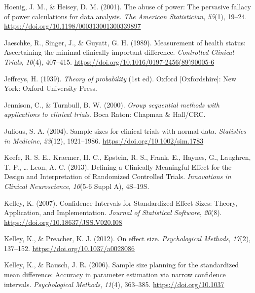 \documentclass[
  english,
  ,jou, a4paper,floatsintext]{apa6}
\newlength{\cslhangindent}
\newenvironment{cslreferences}%
  {\setlength{\parindent}{0pt}%
  \everypar{\setlength{\hangindent}{\cslhangindent}}\ignorespaces}%
  {\par}
\begin{document}
\begin{cslreferences}
\leavevmode\hypertarget{ref-hoenig_abuse_2001}{}%
Hoenig, J. M., \& Heisey, D. M. (2001). The abuse of power: The pervasive fallacy of power calculations for data analysis. \emph{The American Statistician}, \emph{55}(1), 19--24. \url{https://doi.org/10.1198/000313001300339897}

\leavevmode\hypertarget{ref-jaeschke_measurement_1989}{}%
Jaeschke, R., Singer, J., \& Guyatt, G. H. (1989). Measurement of health status: Ascertaining the minimal clinically important difference. \emph{Controlled Clinical Trials}, \emph{10}(4), 407--415. \url{https://doi.org/10.1016/0197-2456(89)90005-6}

\leavevmode\hypertarget{ref-jeffreys_theory_1939}{}%
Jeffreys, H. (1939). \emph{Theory of probability} (1st ed). Oxford {[}Oxfordshire{]}: New York: Oxford University Press.

\leavevmode\hypertarget{ref-jennison_group_2000}{}%
Jennison, C., \& Turnbull, B. W. (2000). \emph{Group sequential methods with applications to clinical trials}. Boca Raton: Chapman \& Hall/CRC.

\leavevmode\hypertarget{ref-julious_sample_2004}{}%
Julious, S. A. (2004). Sample sizes for clinical trials with normal data. \emph{Statistics in Medicine}, \emph{23}(12), 1921--1986. \url{https://doi.org/10.1002/sim.1783}

\leavevmode\hypertarget{ref-keefe_defining_2013}{}%
Keefe, R. S. E., Kraemer, H. C., Epstein, R. S., Frank, E., Haynes, G., Laughren, T. P., \ldots{} Leon, A. C. (2013). Defining a Clinically Meaningful Effect for the Design and Interpretation of Randomized Controlled Trials. \emph{Innovations in Clinical Neuroscience}, \emph{10}(5-6 Suppl A), 4S--19S.

\leavevmode\hypertarget{ref-kelley_confidence_2007}{}%
Kelley, K. (2007). Confidence Intervals for Standardized Effect Sizes: Theory, Application, and Implementation. \emph{Journal of Statistical Software}, \emph{20}(8). \url{https://doi.org/10.18637/JSS.V020.I08}

\leavevmode\hypertarget{ref-kelley_effect_2012}{}%
Kelley, K., \& Preacher, K. J. (2012). On effect size. \emph{Psychological Methods}, \emph{17}(2), 137--152. \url{https://doi.org/10.1037/a0028086}

\leavevmode\hypertarget{ref-kelley_sample_2006}{}%
Kelley, K., \& Rausch, J. R. (2006). Sample size planning for the standardized mean difference: Accuracy in parameter estimation via narrow confidence intervals. \emph{Psychological Methods}, \emph{11}(4), 363--385. \url{https://doi.org/10.1037}


\end{cslreferences}
\end{document}
